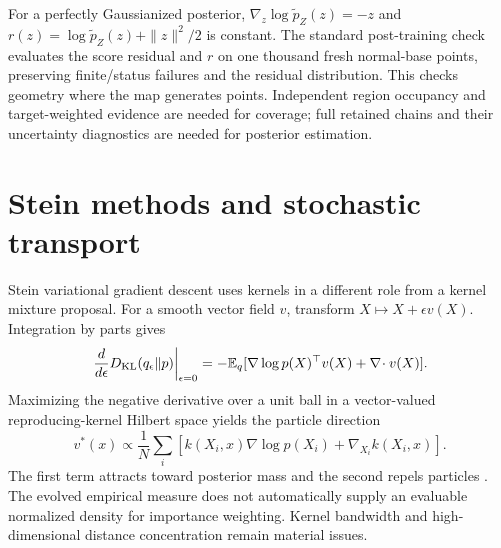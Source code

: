 For a perfectly Gaussianized posterior,
$\nabla_z\log\widetilde p_Z(z)=-z$ and
$r(z)=\log\widetilde p_Z(z)+\|z\|^2/2$ is constant. The standard post-training
check evaluates the score residual and $r$ on one thousand fresh normal-base
points, preserving finite/status failures and the residual distribution.
This checks geometry where the map generates points. Independent region
occupancy and target-weighted evidence are needed for coverage; full retained
chains and their uncertainty diagnostics are needed for posterior estimation.

\section{Stein methods and stochastic transport}

Stein variational gradient descent uses kernels in a different role from a
kernel mixture proposal. For a smooth vector field $v$, transform
$X\mapsto X+\epsilon v(X)$. Integration by parts gives
\begin{equation}
 \left.\frac{d}{d\epsilon}D_{\mathrm{KL}}(q_\epsilon\Vert p)
 \right|_{\epsilon=0}
 =-\mathbb{E}_q[\nabla\log p(X)^\top v(X)+\nabla\!\cdot v(X)].
 \label{eq:bf-is-stein-direction}
\end{equation}
Maximizing the negative derivative over a unit ball in a vector-valued
reproducing-kernel Hilbert space yields the particle direction
\begin{equation}
 v^*(x)\propto\frac1N\sum_i
 [k(X_i,x)\nabla\log p(X_i)+\nabla_{X_i}k(X_i,x)].
 \label{eq:bf-is-svgd}
\end{equation}
The first term attracts toward posterior mass and the second repels particles
\citep{liu2016svgd}. The evolved empirical measure does not automatically supply
an evaluable normalized density for importance weighting. Kernel bandwidth and
high-dimensional distance concentration remain material issues.

